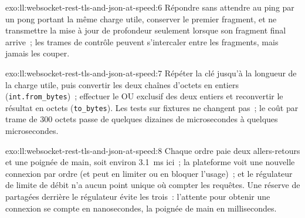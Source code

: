 \begin{solution}{exo:ll:websocket-rest-tls-and-json-at-speed:6}
Répondre sans attendre au ping par un pong portant la même charge utile, conserver le premier fragment, et ne transmettre la mise à jour de profondeur seulement
lorsque son fragment final arrive~; les trames de contrôle peuvent s'intercaler entre les fragments, mais jamais les couper.
\end{solution}

\begin{solution}{exo:ll:websocket-rest-tls-and-json-at-speed:7}
Répéter la clé jusqu'à la longueur de la charge utile, puis convertir les deux chaînes d'octets en entiers
(\texttt{int.from\_bytes})~; effectuer le OU exclusif des deux entiers et reconvertir le résultat en octets (\texttt{to\_bytes}). Les tests sur fixtures ne changent pas~; le coût par trame de 300 octets passe de
quelques dizaines de microsecondes à quelques microsecondes.
\end{solution}

\begin{solution}{exo:ll:websocket-rest-tls-and-json-at-speed:8}
Chaque ordre paie deux allers-retours et une poignée de main, soit environ \qty{3.1}{\milli\second} ici~; la plateforme voit une nouvelle connexion par ordre
(et peut en limiter ou en bloquer l'usage)~; et le régulateur de limite de débit n'a aucun point unique où compter les requêtes. Une réserve de 
partagées derrière le régulateur évite les trois~: l'attente pour obtenir une connexion se compte en nanosecondes, la poignée de main en
millisecondes.
\end{solution}

